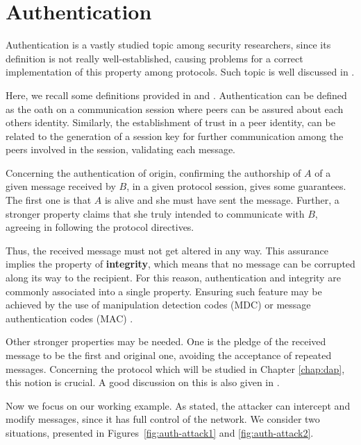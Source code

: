 \section{Authentication}
\label{sec:protocols:auth}
Authentication is a vastly studied topic among security researchers, since its definition is not really well-established, causing problems for a correct implementation of this property among protocols. Such topic is well discussed in \cite{Gollmann2000}.

Here, we recall some definitions provided in \cite{Diffie92} and \cite{RyanSchneider2010}. Authentication can be defined as the oath on a communication session where peers can be assured about each others identity. Similarly, the establishment of trust in a peer identity, can be related to the generation of a session key for further communication among the peers involved in the session, validating each message.

Concerning the authentication of origin, confirming the authorship of $A$ of a given message received by $B$, in a given protocol session, gives some guarantees. The first one is that $A$ is alive and she must have sent the message. Further, a stronger property claims that she truly intended to communicate with $B$, agreeing in following the protocol directives.

Thus, the received message must not get altered in any way. This assurance implies the property of \textbf{integrity}, which means that no message can be corrupted along its way to the recipient. For this reason, authentication and integrity are commonly associated into a single property. Ensuring such feature may be achieved by the use of manipulation detection codes (MDC) or message authentication codes (MAC) \cite{ross-security}.

Other stronger properties may be needed. One is the pledge of the received message to be the first and original one, avoiding the acceptance of repeated messages. Concerning the protocol which will be studied in Chapter \ref{chap:dap}, this notion is crucial. A good discussion on this is also given in \cite{Gollmann2000}.

Now we focus on our working example. As stated, the attacker can intercept and modify messages, since it has full control of the network. We consider two situations, presented in Figures~\ref{fig:auth-attack1} and \ref{fig:auth-attack2}.

